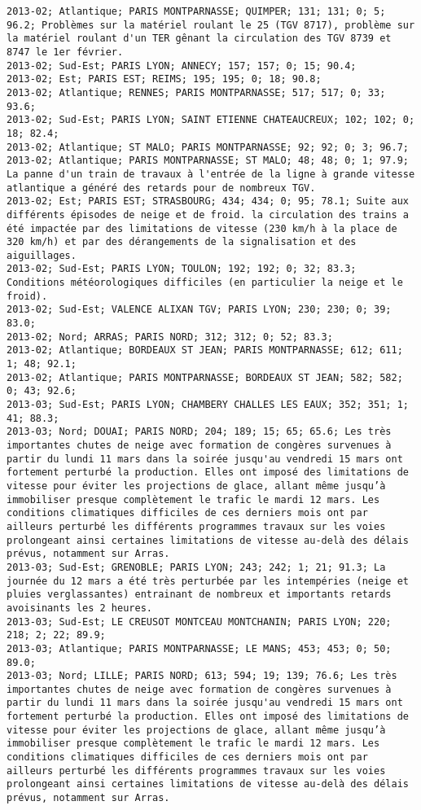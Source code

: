 \documentclass{article}
\begin{document}
\begin{Verbatim}[commandchars=\\\{\}]
2013-02; Atlantique; PARIS MONTPARNASSE; QUIMPER; 131; 131; 0; 5; 96.2; Problèmes sur la matériel roulant le 25 (TGV 8717), problème sur la matériel roulant d'un TER gênant la circulation des TGV 8739 et 8747 le 1er février.
2013-02; Sud-Est; PARIS LYON; ANNECY; 157; 157; 0; 15; 90.4; 
2013-02; Est; PARIS EST; REIMS; 195; 195; 0; 18; 90.8; 
2013-02; Atlantique; RENNES; PARIS MONTPARNASSE; 517; 517; 0; 33; 93.6; 
2013-02; Sud-Est; PARIS LYON; SAINT ETIENNE CHATEAUCREUX; 102; 102; 0; 18; 82.4; 
2013-02; Atlantique; ST MALO; PARIS MONTPARNASSE; 92; 92; 0; 3; 96.7; 
2013-02; Atlantique; PARIS MONTPARNASSE; ST MALO; 48; 48; 0; 1; 97.9; La panne d'un train de travaux à l'entrée de la ligne à grande vitesse atlantique a généré des retards pour de nombreux TGV.
2013-02; Est; PARIS EST; STRASBOURG; 434; 434; 0; 95; 78.1; Suite aux différents épisodes de neige et de froid. la circulation des trains a été impactée par des limitations de vitesse (230 km/h à la place de 320 km/h) et par des dérangements de la signalisation et des aiguillages.
2013-02; Sud-Est; PARIS LYON; TOULON; 192; 192; 0; 32; 83.3; Conditions météorologiques difficiles (en particulier la neige et le froid).
2013-02; Sud-Est; VALENCE ALIXAN TGV; PARIS LYON; 230; 230; 0; 39; 83.0; 
2013-02; Nord; ARRAS; PARIS NORD; 312; 312; 0; 52; 83.3; 
2013-02; Atlantique; BORDEAUX ST JEAN; PARIS MONTPARNASSE; 612; 611; 1; 48; 92.1; 
2013-02; Atlantique; PARIS MONTPARNASSE; BORDEAUX ST JEAN; 582; 582; 0; 43; 92.6; 
2013-03; Sud-Est; PARIS LYON; CHAMBERY CHALLES LES EAUX; 352; 351; 1; 41; 88.3; 
2013-03; Nord; DOUAI; PARIS NORD; 204; 189; 15; 65; 65.6; Les très importantes chutes de neige avec formation de congères survenues à partir du lundi 11 mars dans la soirée jusqu'au vendredi 15 mars ont fortement perturbé la production. Elles ont imposé des limitations de vitesse pour éviter les projections de glace, allant même jusqu’à immobiliser presque complètement le trafic le mardi 12 mars. Les conditions climatiques difficiles de ces derniers mois ont par ailleurs perturbé les différents programmes travaux sur les voies prolongeant ainsi certaines limitations de vitesse au-delà des délais prévus, notamment sur Arras.
2013-03; Sud-Est; GRENOBLE; PARIS LYON; 243; 242; 1; 21; 91.3; La journée du 12 mars a été très perturbée par les intempéries (neige et pluies verglassantes) entrainant de nombreux et importants retards avoisinants les 2 heures.
2013-03; Sud-Est; LE CREUSOT MONTCEAU MONTCHANIN; PARIS LYON; 220; 218; 2; 22; 89.9; 
2013-03; Atlantique; PARIS MONTPARNASSE; LE MANS; 453; 453; 0; 50; 89.0; 
2013-03; Nord; LILLE; PARIS NORD; 613; 594; 19; 139; 76.6; Les très importantes chutes de neige avec formation de congères survenues à partir du lundi 11 mars dans la soirée jusqu'au vendredi 15 mars ont fortement perturbé la production. Elles ont imposé des limitations de vitesse pour éviter les projections de glace, allant même jusqu’à immobiliser presque complètement le trafic le mardi 12 mars. Les conditions climatiques difficiles de ces derniers mois ont par ailleurs perturbé les différents programmes travaux sur les voies prolongeant ainsi certaines limitations de vitesse au-delà des délais prévus, notamment sur Arras.

\end{Verbatim}
\end{document}
